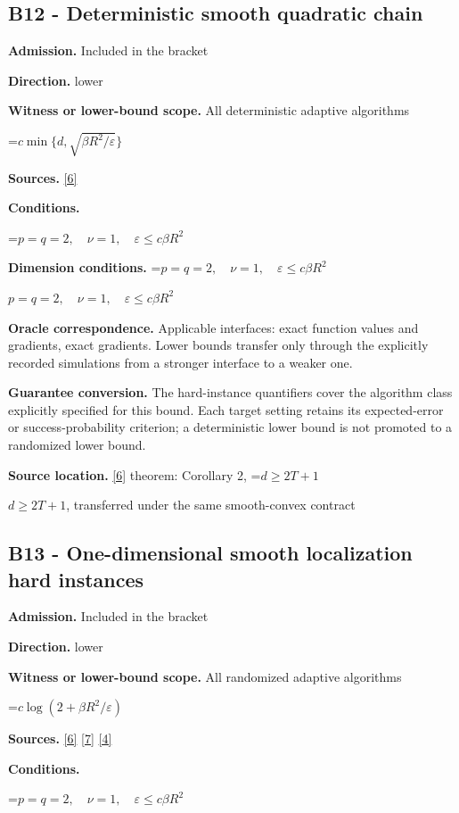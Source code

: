 \documentclass[10pt,a4paper]{article}
\newcommand{\AtlasMath}[1]{\par\begingroup\centering\setbox0=\hbox{$\displaystyle #1$}\ifdim\wd0>1.4\linewidth\typeout{ATLAS WIDE FORMULA: \the\wd0}\fi\ifdim\wd0>\linewidth\resizebox{\linewidth}{!}{\box0}\else\box0\fi\par\endgroup}
\newcommand{\AtlasInlineMath}[1]{\begingroup\setbox0=\hbox{$#1$}\ifdim\wd0>.4\linewidth\endgroup\AtlasMath{#1}\else\endgroup$#1$\fi}
\begin{document}
\subsection{B12 - Deterministic smooth quadratic chain}
\textbf{Admission.} Included in the bracket

\textbf{Direction.} lower

\textbf{Witness or lower-bound scope.} All deterministic adaptive algorithms

\AtlasMath{c\min\{d,\sqrt{\beta R^2/\varepsilon}\}}
\textbf{Sources.} \href{https://arxiv.org/pdf/2101.09740v2}{[6]}

\textbf{Conditions.} 
\AtlasMath{p=q=2,\quad\nu=1,\quad\varepsilon\le c\beta R^2}


\textbf{Dimension conditions.} \AtlasInlineMath{p=q=2,\quad\nu=1,\quad\varepsilon\le c\beta R^2}

\textbf{Oracle correspondence.} Applicable interfaces: exact function values and gradients, exact gradients. Lower bounds transfer only through the explicitly recorded simulations from a stronger interface to a weaker one.

\textbf{Guarantee conversion.} The hard-instance quantifiers cover the algorithm class explicitly specified for this bound. Each target setting retains its expected-error or success-probability criterion; a deterministic lower bound is not promoted to a randomized lower bound.

\textbf{Source location.} \href{https://arxiv.org/pdf/2101.09740v2}{[6]} theorem: Corollary 2, \AtlasInlineMath{d\ge2T+1}, transferred under the same smooth-convex contract

\subsection{B13 - One-dimensional smooth localization hard instances}
\textbf{Admission.} Included in the bracket

\textbf{Direction.} lower

\textbf{Witness or lower-bound scope.} All randomized adaptive algorithms

\AtlasMath{c\log(2+\beta R^2/\varepsilon)}
\textbf{Sources.} \href{https://arxiv.org/pdf/2101.09740v2}{[6]} \href{https://arxiv.org/pdf/2609.33360v2}{[7]} \href{https://arxiv.org/pdf/2609.10874}{[4]}

\textbf{Conditions.} 
\AtlasMath{p=q=2,\quad\nu=1,\quad\varepsilon\le c\beta R^2}
\end{document}
